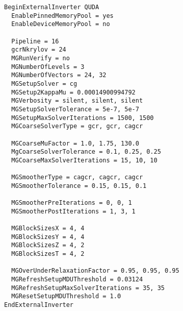 \begin{verbatim}
BeginExternalInverter QUDA
  EnablePinnedMemoryPool = yes 
  EnableDeviceMemoryPool = no

  Pipeline = 16
  gcrNkrylov = 24
  MGRunVerify = no
  MGNumberOfLevels = 3
  MGNumberOfVectors = 24, 32
  MGSetupSolver = cg
  MGSetup2KappaMu = 0.00014900994792
  MGVerbosity = silent, silent, silent
  MGSetupSolverTolerance = 5e-7, 5e-7
  MGSetupMaxSolverIterations = 1500, 1500
  MGCoarseSolverType = gcr, gcr, cagcr

  MGCoarseMuFactor = 1.0, 1.75, 130.0
  MgCoarseSolverTolerance = 0.1, 0.25, 0.25
  MGCoarseMaxSolverIterations = 15, 10, 10

  MGSmootherType = cagcr, cagcr, cagcr
  MGSmootherTolerance = 0.15, 0.15, 0.1

  MGSmootherPreIterations = 0, 0, 1
  MGSmootherPostIterations = 1, 3, 1

  MGBlockSizesX = 4, 4
  MGBlockSizesY = 4, 4
  MGBlockSizesZ = 4, 2
  MGBlockSizesT = 4, 2

  MGOverUnderRelaxationFactor = 0.95, 0.95, 0.95
  MGRefreshSetupMDUThreshold = 0.03124
  MGRefreshSetupMaxSolverIterations = 35, 35
  MGResetSetupMDUThreshold = 1.0
EndExternalInverter
\end{verbatim}

